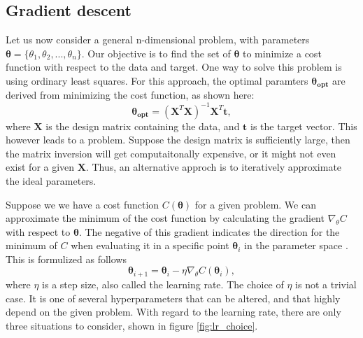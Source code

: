 \subsection*{Gradient descent}
Let us now consider a general n-dimensional problem, with parameters $\boldsymbol{\theta} = \{\theta_1, \theta_2, ..., \theta_n\}$. 
Our objective is to find the set of $\boldsymbol{\theta}$ to minimize a cost function with respect to the data and target. 
One way to solve this problem is using ordinary least squares. For this approach, 
the optimal paramters $\boldsymbol{\theta_{opt}}$ are derived from minimizing the cost function, as shown here:
\begin{equation*}
    \boldsymbol{\theta_{opt}} = (\boldsymbol{X}^T\boldsymbol{X})^{-1}\boldsymbol{X}^T\boldsymbol{t},
\end{equation*}
where $\boldsymbol{X}$ is the design matrix containing the data, and $\boldsymbol{t}$ is the target vector. This however leads to a problem. Suppose the design matrix is sufficiently large,
then the matrix inversion will get computaitonally expensive, or it might not even exist for a given $\boldsymbol{X}$. Thus, an alternative approch is to iteratively approximate the ideal 
parameters. \par 
Suppose we we have a cost function $C(\boldsymbol{\theta})$ for a given problem. We can approximate the minimum of the cost function by calculating
the gradient $\nabla_{\theta}C$ with respect to $\boldsymbol{\theta}$. The negative of this gradient indicates the direction for the minimum of $C$ when evaluating 
it in a specific point $\boldsymbol{\theta}_i$ in the parameter space \cite{FYSSTK}. This is formulized as follows 
\begin{equation}
    \boldsymbol{\theta}_{i+1} = \boldsymbol{\theta}_i - \eta\nabla_{\theta}C(\boldsymbol{\theta}_i),
\end{equation}
where $\eta$ is a step size, also called the learning rate. The choice of $\eta$ is not a trivial case. It is one of several 
hyperparameters\cite{Goodfellow-et-al-2016} that can be altered, and that highly depend on the given problem. 
With regard to the learning rate, there are only three situations to consider, shown in figure \ref{fig:lr_choice}.

